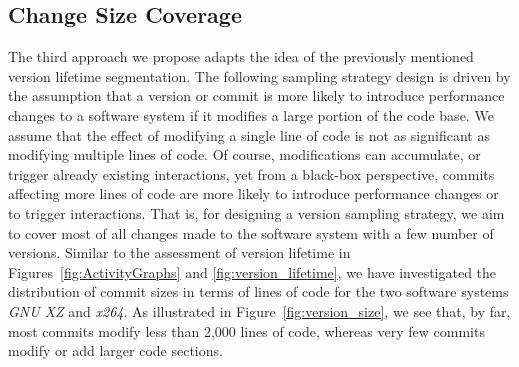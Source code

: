 \subsection{Change Size Coverage}\label{sec:changesizesampling}
The third approach we propose adapts the idea of the previously mentioned
version lifetime segmentation. The following sampling strategy design is driven
by the assumption that a version or commit is more likely to introduce
performance changes to a software system if it modifies a large portion of
the code base. We assume that the effect of modifying a single line of code is
not as significant as modifying multiple lines of code. Of course, modifications can
accumulate, or trigger already existing interactions, yet from a black-box
perspective, commits affecting more lines of code are more likely to introduce
performance changes or to trigger interactions. That is, for designing a
version sampling strategy, we aim to cover most of all changes made to the
software system with a few number of versions. Similar to the assessment of
version lifetime in Figures~\ref{fig:ActivityGraphs} and
\ref{fig:version_lifetime}, we have investigated the distribution of commit
sizes in terms of lines of code for the two software systems \emph{GNU XZ} and
\emph{x264}. As illustrated in Figure~\ref{fig:version_size}, we see that, by far, most
commits modify less than 2,000 lines of code, whereas very few commits modify
or add larger code sections.

